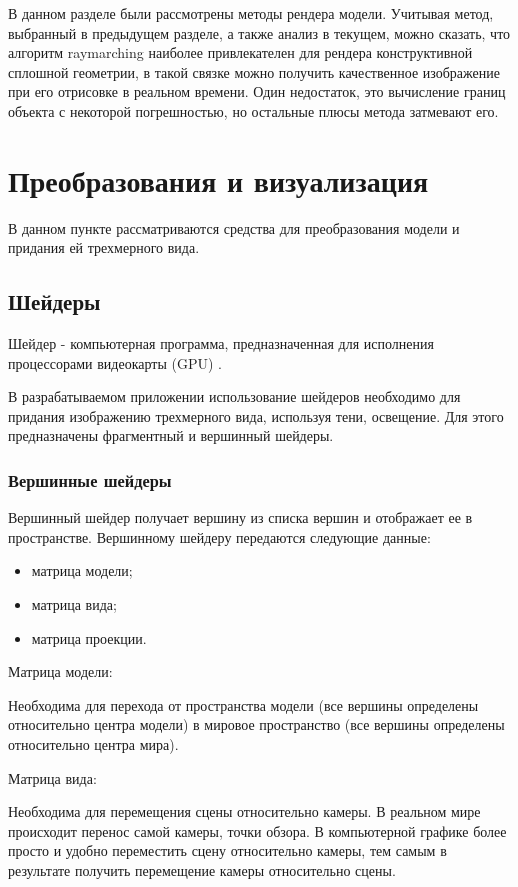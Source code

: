 В данном разделе были рассмотрены методы рендера модели. Учитывая метод, выбранный в предыдущем  разделе, а также анализ в текущем,
можно сказать, что алгоритм raymarching наиболее привлекателен для рендера конструктивной сплошной геометрии,
в такой связке можно получить качественное изображение при его отрисовке в реальном времени. 
Один недостаток, это вычисление границ объекта с некоторой погрешностью, но остальные плюсы метода затмевают его.  
\section{Преобразования и визуализация}
В данном пункте рассматриваются средства для преобразования модели и 
придания ей трехмерного вида.
\subsection{Шейдеры}
Шейдер -  компьютерная программа, предназначенная для исполнения процессорами видеокарты (GPU) \cite{article:shaders}.

В разрабатываемом приложении использование шейдеров необходимо для придания изображению трехмерного вида, 
используя тени, освещение. 
Для этого предназначены фрагментный и вершинный шейдеры.
\subsubsection{Вершинные шейдеры} \label{anl:vert_shader}
Вершинный шейдер получает вершину из списка вершин и отображает ее в пространстве.
Вершинному шейдеру передаются следующие данные:
\begin{itemize}
  \item матрица модели;
  \item матрица вида;
  \item матрица проекции.
\end{itemize}

Матрица модели:

Необходима для перехода от пространства модели (все вершины определены относительно центра модели) 
в мировое пространство (все вершины определены относительно центра мира).

Матрица вида:

Необходима для перемещения сцены относительно камеры. В реальном мире происходит перенос самой камеры, точки обзора. 
В компьютерной графике более просто и удобно переместить сцену относительно камеры, тем самым в результате 
получить перемещение камеры относительно сцены.  

